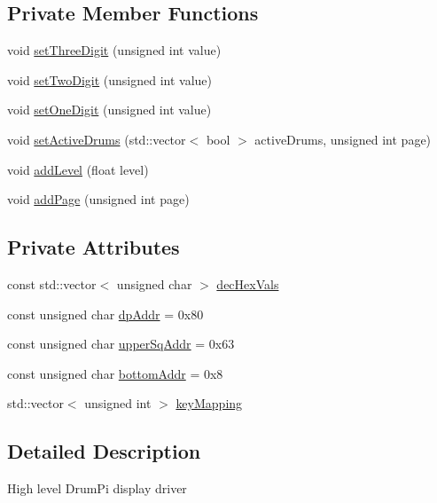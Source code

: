 \subsection*{Private Member Functions}
\begin{DoxyCompactItemize}
\item 
void \hyperlink{classdrumpi_1_1Display_acd75af285265d26173f4481a92eb5d8c}{set\+Three\+Digit} (unsigned int value)
\item 
void \hyperlink{classdrumpi_1_1Display_a6430f2a097b1c2d3cd71e7d4ee9e375c}{set\+Two\+Digit} (unsigned int value)
\item 
void \hyperlink{classdrumpi_1_1Display_ade135706a915e866e06ec8c30202ee79}{set\+One\+Digit} (unsigned int value)
\item 
void \hyperlink{classdrumpi_1_1Display_ad80799724d362dcbb260d368bfdc18c3}{set\+Active\+Drums} (std\+::vector$<$ bool $>$ active\+Drums, unsigned int page)
\item 
void \hyperlink{classdrumpi_1_1Display_aed0dfcb7bbf5209a9a1501e2d63fe947}{add\+Level} (float level)
\item 
void \hyperlink{classdrumpi_1_1Display_a8ff778f88ca14acb0232b0afec54b972}{add\+Page} (unsigned int page)
\end{DoxyCompactItemize}
\subsection*{Private Attributes}
\begin{DoxyCompactItemize}
\item 
const std\+::vector$<$ unsigned char $>$ \hyperlink{classdrumpi_1_1Display_a6a545666c68e6fc74c386d47e1b86635}{dec\+Hex\+Vals}
\item 
const unsigned char \hyperlink{classdrumpi_1_1Display_a262abe3f60fd889ec627bf3e08f1468e}{dp\+Addr} = 0x80
\item 
const unsigned char \hyperlink{classdrumpi_1_1Display_a6edbae4cb83ea5fd2e37fb0549abec58}{upper\+Sq\+Addr} = 0x63
\item 
const unsigned char \hyperlink{classdrumpi_1_1Display_a071f2149fd9687d8b3c33fb92fe08fb1}{bottom\+Addr} = 0x8
\item 
std\+::vector$<$ unsigned int $>$ \hyperlink{classdrumpi_1_1Display_ae168cc9f5c514995b51c483b81f6be2b}{key\+Mapping}
\end{DoxyCompactItemize}


\subsection{Detailed Description}
High level Drum\+Pi display driver 


